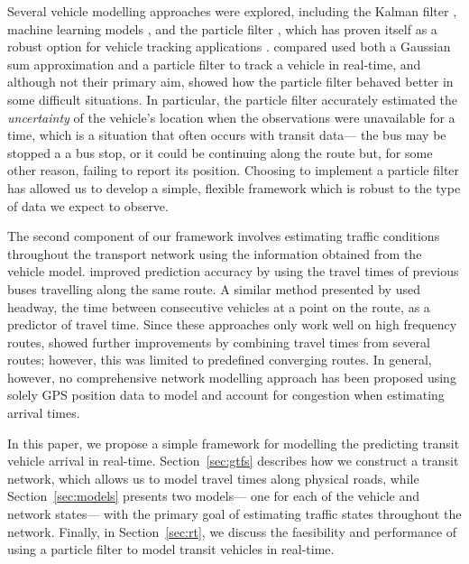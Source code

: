Several vehicle modelling approaches were explored, 
including the Kalman filter \citep{Dailey_2001,Cathey_2003},
machine learning models \citep{Yu_2006,Chang_2010},
and the particle filter \citep{Hans_2015},
which has proven itself as a robust option for
\rt vehicle tracking applications
\citep{Gustafsson_2002,Davidson_2011}.
\cite{Ulmke_2006} compared used both a Gaussian sum approximation and a particle filter
to track a vehicle in real-time,
and although not their primary aim,
showed how the particle filter behaved better in some difficult situations.
In particular, the particle filter accurately estimated the \emph{uncertainty}
of the vehicle's location when the observations were unavailable for a time,
which is a situation that often occurs with transit data---%
the bus may be stopped a a bus stop, or it could be continuing along the route but,
for some other reason, failing to report its position.
Choosing to implement a particle filter has allowed us
to develop a simple, flexible framework
which is robust to the type of data we expect to observe.


The second component of our framework 
involves estimating traffic conditions throughout the transport network
using the information obtained from the vehicle model.
\cite{Yu_2010} improved prediction accuracy by using the travel times
of previous buses travelling along the same route.
A similar method presented by \cite{Hans_2015}
used headway, the time between consecutive vehicles at a point on the route,
as a predictor of travel time.
Since these approaches only work well on high frequency routes,
\cite{Yu_2011} showed further improvements by combining travel times 
from several routes;
however, this was limited to predefined converging routes.
In general, however, no comprehensive network modelling approach has been proposed using
solely GPS position data to model and account for congestion when estimating arrival times.


In this paper, we propose a simple framework for modelling the predicting
transit vehicle arrival in real-time.
Section~\ref{sec:gtfs} describes how we construct a transit network,
which allows us to model travel times along physical roads,
while Section~\ref{sec:models} presents two \rt models---%
one for each of the vehicle and network states---%
with the primary goal of estimating \rt traffic states throughout the network.
Finally, in Section~\ref{sec:rt}, we discuss the \rt faesibility and performance
of using a particle filter to model transit vehicles in real-time.




